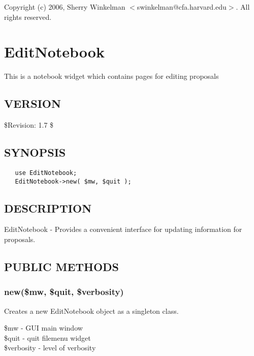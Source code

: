 \documentclass{article}
\begin{document}
Copyright (c) 2006, Sherry Winkelman $<$swinkelman@cfa.harvard.edu$>$. All rights 
reserved.

\clearpage
\section{EditNotebook\label{EditNotebook}}


This is a notebook widget which contains pages for editing 
proposals

\subsection*{VERSION\label{EditNotebook_VERSION}}


\$Revision: 1.7 \$

\subsection*{SYNOPSIS\label{EditNotebook_SYNOPSIS}}
\begin{verbatim}
   use EditNotebook;
   EditNotebook->new( $mw, $quit );
\end{verbatim}
\subsection*{DESCRIPTION\label{EditNotebook_DESCRIPTION}}


EditNotebook - Provides a convenient interface for updating information for
proposals.

\subsection*{PUBLIC METHODS\label{EditNotebook_PUBLIC_METHODS}}
\subsubsection*{new(\$mw, \$quit, \$verbosity)\label{EditNotebook_new_mw_quit_verbosity_}}


Creates a new EditNotebook object as a singleton class.

\begin{description}

\item[{\$mw - GUI main window}] \mbox{}
\item[{\$quit - quit filemenu widget}] \mbox{}
\item[{\$verbosity - level of verbosity}] \mbox{}\end{description}
\end{document}
